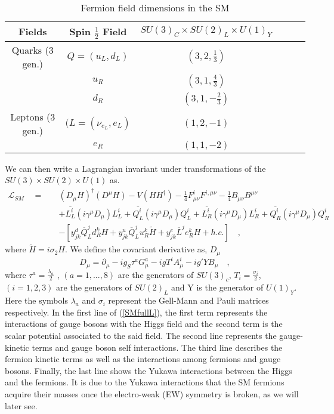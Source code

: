 %
%
\begin{table}[ht]
\centering
\caption{Fermion field dimensions in the SM}
\label{table2}
\begin{tabular}{@{}cccccc@{}}
  \hline	
 Fields & Spin $\frac{1}{2}$ Field & $SU(3)_C \times SU(2)_L \times U(1)_Y$  \\
  \hline	
Quarks (3 gen.) & $Q=(u_L,d_L)$ & $(3,2,\frac{1}{3})$ \\	
$\quad$        & $u_R$ & $(3,1,\frac{4}{3})$   \\
$\quad$   & $d_R$ & $(3,1, -\frac{2}{3})$   \\
Leptons (3 gen.) & $(L=(\nu_{e_L}, e_L )$ & $(1,2,-1)$  \\
$\quad$   & $e_R$ & $(1,1,-2)   $ \\ \hline

\end{tabular}
\end{table}
%
We can then write a Lagrangian invariant under transformations of the $SU(3) \times SU(2) \times U(1)$ as.
%
\begin{align}
\mathcal{L}_{SM} \quad = \quad & (D_\mu H)^\dagger (D^\mu H) - V (H H^\dagger) -  \frac{1}{4} F^i_{\mu \nu} F^{i , \mu \nu} - \frac{1}{4} B_{\mu \nu} B^{\mu \nu} \nonumber \\ 
& + \overline{L_L^i} (i \gamma^\mu D_\mu)  L_L^i +  \overline{Q^i_L} (i \gamma^\mu D_\mu)  Q^i_L +  \overline{L_R^i} (i \gamma^\mu D_\mu)  L_R^i +  \overline{Q^i_R} (i \gamma^\mu D_\mu)  Q^i_R \label{SMfullL}    \\  
 & - [y^d_{jk}\overline{Q}^j_{L} d^k_{R} H +  y_{jk}^u \overline{Q}^j_{L} u^k_{R} \tilde{H} + y^e_{jk} \overline{L}^j e^k_{R} H  + h.c. ] \nonumber \quad , 
\end{align}
%
where $\tilde{H}=i\sigma_2 H$. We define the covariant derivative as, $D_\mu$
%
\begin{equation}
D_\mu = \partial_\mu - i g_S \tau^a G^a_\mu - i g T^i A^i_\mu - i g' Y B_\mu \quad ,  
\end{equation}
%
where $\tau^a= \frac{\lambda_a}{2}$ , $(a = 1, . . . , 8)$ are the generators of $SU (3)_c$, $T_i= \frac{\sigma_i}{2} $, $(i = 1, 2, 3)$ are the generators of $SU(2)_L$ and Y is the generator of $U(1)_Y$. Here the symbols $\lambda_a$ and $\sigma_i$ represent the Gell-Mann and Pauli matrices respectively. 
%
%
In the first line of (\ref{SMfullL}), the first term represents the interactions of gauge bosons with the Higgs field and the second term is the scalar potential associated to the said field. 
%
The second line represents the gauge-kinetic terms and gauge boson self interactions. The third line describes the fermion kinetic terms as well as the interactions among fermions and gauge bosons. Finally, the last line shows the Yukawa interactions between the Higgs and the fermions. It is due to the Yukawa interactions that the SM fermions acquire their masses once the electro-weak (EW) symmetry is broken, as we will later see.

